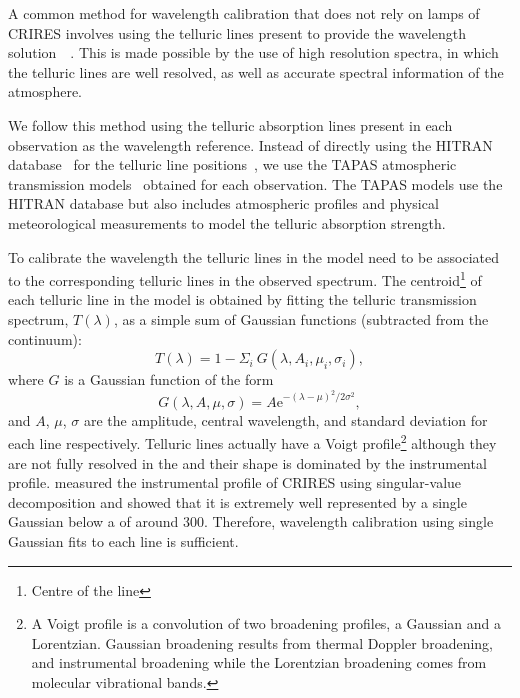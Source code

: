 A common method for wavelength calibration that does not rely on \thar{} lamps of {CRIRES} involves using the telluric lines present to provide the wavelength solution~\citep[e.g.][]{brogi_signature_2012,brogi_carbon_2014,dekok_detection_2013}{\red{}~\citep{piskorz_evidence_2016}}.
This is made possible by the use of high resolution spectra, in which the telluric lines are well resolved, as well as accurate spectral information of the atmosphere.

We follow this method using the telluric absorption lines present in each observation as the wavelength reference.
Instead of directly using the {HITRAN} database~\citep{rothman_hitran2012_2013} for the telluric line positions~\citet[such as in][]{brogi_signature_2012,brogi_carbon_2014,dekok_detection_2013}, we use the {TAPAS} atmospheric transmission models~\citep{bertaux_tapas_2014} obtained for each observation.
The {TAPAS} models use the {HITRAN} database but also includes atmospheric profiles and physical meteorological measurements to model the telluric absorption strength.

To calibrate the wavelength the telluric lines in the model need to be associated to the corresponding telluric lines in the observed spectrum.
The centroid\footnote{Centre of the line} of each telluric line in the model is obtained by fitting the telluric transmission spectrum, \(T(\lambda)\), as a simple sum of Gaussian functions (subtracted from the continuum):
\begin{equation}
T(\lambda) = 1 - {\Sigma}_{i}\ G(\lambda, A_{i}, {\mu}_{i}, {\sigma}_{i}),
\end{equation}
where \(G\) is a Gaussian function of the form
\begin{equation}
G(\lambda, A, \mu, \sigma) = {A \textrm{e}}^{{-(\lambda-\mu)}^{2}/2\sigma^{2}},
\end{equation}
and \(A\), \(\mu\), \(\sigma\) are the amplitude, central wavelength, and standard deviation for each line respectively.
Telluric lines actually have a Voigt profile\footnote{A Voigt profile is a convolution of two broadening profiles, a Gaussian and a Lorentzian.
Gaussian broadening results from thermal Doppler broadening, and instrumental broadening while the Lorentzian broadening comes from molecular vibrational bands\citep{meier_art_2005}.} although they are not fully resolved in the \nir{} and their shape is dominated by the instrumental profile. \citet{seifahrt_synthesising_2010} measured the instrumental profile of {CRIRES} using singular-value decomposition and showed that it is extremely well represented by a single Gaussian below a \snr{} of around 300.
Therefore, wavelength calibration using single Gaussian fits to each line is sufficient.

